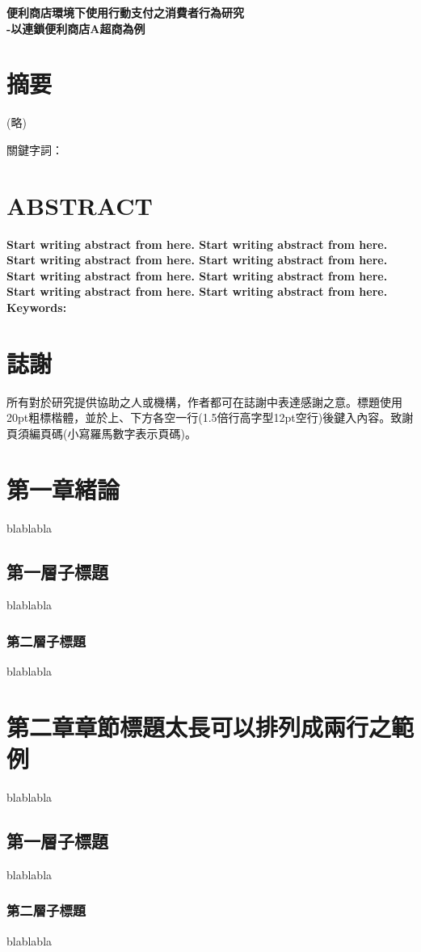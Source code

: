 \documentclass[12pt]{ncut}
\begin{document}
\begin{center} %
    \Large
    \textbf{便利商店環境下使用行動支付之消費者行為研究\\
    -以連鎖便利商店A超商為例}
\end{center}

\section{摘要}
\begin{center}
    (略)
\end{center}
\noindent 關鍵字詞：

\newpage

\section{ABSTRACT}

\textbf{Start writing abstract from here. Start writing abstract from here. Start writing abstract from here. Start writing abstract from here. Start writing abstract from here. Start writing abstract from here. Start writing abstract from here. Start writing abstract from here.\\
Keywords:}

\newpage

\section{誌謝}

\indent
所有對於研究提供協助之人或機構，作者都可在誌謝中表達感謝之意。標題使用 20pt粗標楷體，並於上、下方各空一行(1.5倍行高字型12pt空行)後鍵入內容。致謝頁須編頁碼(小寫羅馬數字表示頁碼)。

\newpage

\tableofcontents
\newpage

\listoftables
\newpage

\listoffigures
\newpage


\setcounter{section}{0} %
\section{第一章緒論}
blablabla

\subsection{第一層子標題}
blablabla

\subsubsection{第二層子標題}
blablabla

\newpage

\section{第二章章節標題太長可以排列成兩行之範例}
blablabla\cite{8643999}
\subsection{第一層子標題}
blablabla
\subsubsection{第二層子標題}
blablabla

\newpage

\newpage
\printbibliography
\end{document}
